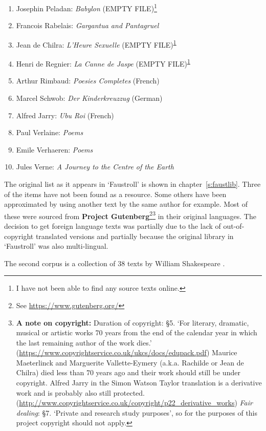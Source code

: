 \begin{enumerate}[start=0]
\item Josephin Peladan: \textit{Babylon} (EMPTY FILE)\footnote{I have not been able to find any source texts online.\label{emptyfile}}
\item Francois Rabelais: \textit{Gargantua and Pantagruel}
\item Jean de Chilra: \textit{L'Heure Sexuelle} (EMPTY FILE)\textsuperscript{\ref{emptyfile}}
\item Henri de Regnier: \textit{La Canne de Jaspe} (EMPTY FILE)\textsuperscript{\ref{emptyfile}}
\item Arthur Rimbaud: \textit{Poesies Completes} (French)
\item Marcel Schwob: \textit{Der Kinderkreuzzug} (German)
\item Alfred Jarry: \textit{Ubu Roi} (French)
\item Paul Verlaine: \textit{Poems}
\item Emile Verhaeren: \textit{Poems}
\item Jules Verne: \textit{A Journey to the Centre of the Earth}
\end{enumerate}

The original list as it appears in `Faustroll' is shown in chapter~\ref{s:faustlib}. Three of the items have not been found as a resource. Some others have been approximated by using another text by the same author for example. Most of these were sourced from \textbf{Project Gutenberg}\footnote{See \url{https://www.gutenberg.org/}}\footnote{\textbf{A note on copyright:} Duration of copyright: §5. `For literary, dramatic, musical or artistic works \num{70} years from the end of the calendar year in which the last remaining author of the work dies.' (\url{https://www.copyrightservice.co.uk/ukcs/docs/edupack.pdf}) Maurice Maeterlinck and Marguerite Vallette-Eymery (a.k.a. Rachilde or Jean de Chilra) died less than \num{70} years ago and their work should still be under copyright. Alfred Jarry in the Simon Watson Taylor translation is a derivative work and is probably also still protected.  (\url{http://www.copyrightservice.co.uk/copyright/p22_derivative_works}) \emph{Fair dealing}: §7. `Private and research study purposes', so for the purposes of this project copyright should not apply.} in their original languages. The decision to get foreign language texts was partially due to the lack of out-of-copyright translated versions and partially because the original library in `Faustroll' was also multi-lingual.

The second corpus is a collection of \num{38} texts by William Shakespeare \citeyear{Shakespeare2011}.

